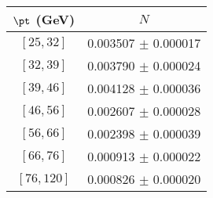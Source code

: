 \begin{tabular}{c||c}
$\pt$ (GeV) & $N$  \\
\hline
$[25, 32]$ & 0.003507 $\pm$ 0.000017\\
$[32, 39]$ & 0.003790 $\pm$ 0.000024\\
$[39, 46]$ & 0.004128 $\pm$ 0.000036\\
$[46, 56]$ & 0.002607 $\pm$ 0.000028\\
$[56, 66]$ & 0.002398 $\pm$ 0.000039\\
$[66, 76]$ & 0.000913 $\pm$ 0.000022\\
$[76, 120]$ & 0.000826 $\pm$ 0.000020\\
\end{tabular}
